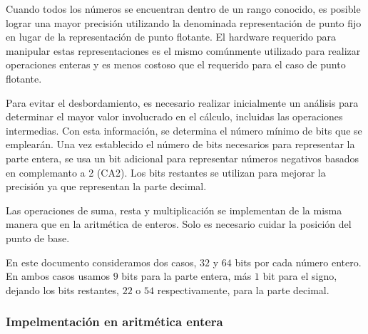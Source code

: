Cuando todos los números se encuentran dentro de un rango conocido, es posible lograr una mayor precisión utilizando la denominada representación de punto fijo en lugar de la representación de punto flotante.
El hardware requerido para manipular estas representaciones es el mismo comúnmente utilizado para realizar operaciones enteras y es menos costoso que el requerido para el caso de punto flotante.

Para evitar el desbordamiento, es necesario realizar inicialmente un análisis para determinar el mayor valor involucrado en el cálculo, incluidas las operaciones intermedias.
Con esta información, se determina el número mínimo de bits que se emplearán.
Una vez establecido el número de bits necesarios para representar la parte entera, se usa un bit adicional para representar números negativos basados en complemanto a 2 (CA2).
Los bits restantes se utilizan para mejorar la precisión ya que representan la parte decimal.

Las operaciones de suma, resta y multiplicación se implementan de la misma manera que en la aritmética de enteros.
Solo es necesario cuidar la posición del punto de base.

En este documento consideramos dos casos, $32$ y $64$ bits por cada número entero.
En ambos casos usamos $9$ bits para la parte entera, más $1$ bit para el signo, dejando los bits restantes, $22$ o $54$ respectivamente, para la parte decimal.

\subsubsection{Impelmentación en aritmética entera}
\label{sec:impleInt}


